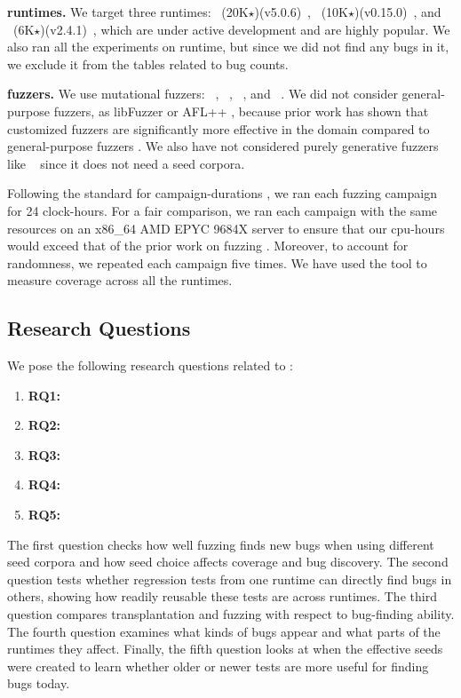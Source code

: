 \documentclass[lettersize,journal]{IEEEtran}
\begin{document}
\noindent\textbf{\wasm{} runtimes.}
We target three runtimes:
\wasmer{}~(20K$\star$)(v5.0.6)~\cite{wasmer}, 
\wasmedge{}~(10K$\star$)(v0.15.0)~\cite{wasmedge}, 
and \wamr{}~(6K$\star$)(v2.4.1)~\cite{wamr}, which are under active development and are highly popular. We also ran all the experiments on \wasmtime{} runtime, but since we did not find any bugs in it, we exclude it from the tables related to bug counts.

\noindent{}\textbf{\wasm{} fuzzers.} We use \fuzzercount{} mutational \wasm{} fuzzers: \wadiff{}~\cite{zhou2023wadiff}, \wasmaker{}~\cite{cao2024wasmaker}, \wapplique{}~\cite{zhao2024wapplique}, and \lwdiff{}~\cite{zhou2025lwdiff}. We did not consider general-purpose fuzzers, as libFuzzer \cite{libFuzzer} or AFL++ \cite{aflplusplus}, because prior work has shown that customized fuzzers are significantly more effective in the \wasm{} domain compared to general-purpose fuzzers \cite{cao2024wasmaker, zhao2024wapplique, zhang2025waltzz}. We also have not considered purely generative fuzzers like \wasmsmith{}~\cite{wasmsmith} since it does not need a seed corpora.

Following the standard for campaign-durations \cite{metzman2021fuzzbench, li2021unifuzz}, we ran each fuzzing campaign for 24 clock-hours. For a fair comparison, we ran each campaign with the same resources on an x86\_64 AMD EPYC 9684X server to ensure that our cpu-hours would exceed that of the prior work on \wasm{} fuzzing  \cite{zhao2024wapplique, cao2024wasmaker, zhou2023wadiff}. Moreover, to account for randomness, we repeated each campaign five times. We have used the  tool to measure coverage across all the runtimes.


\subsection{Research Questions}
\label{sec:rqs}
We pose the following research questions related to \tname{}:

\begin{enumerate}
  \item \textbf{RQ1: \rqone{}}
  \item \textbf{RQ2: \rqtwo{}}
  \item \textbf{RQ3: \rqthree{}}
  \item \textbf{RQ4: \rqfour{}}
  \item \textbf{RQ5: \rqfive{}}
\end{enumerate}

The first question checks how well fuzzing finds new bugs when using different seed corpora and how seed choice affects coverage and bug discovery.
%
The second question tests whether regression tests from one runtime can directly find bugs in others, showing how readily reusable these tests are across runtimes.
%
The third question compares transplantation and fuzzing with respect to bug-finding ability.
%
The fourth question examines what kinds of bugs appear and what parts of the runtimes they affect. 
%
Finally, the fifth question looks at when the effective seeds were created to learn whether older or newer tests are more useful for finding bugs today.
\end{document}
